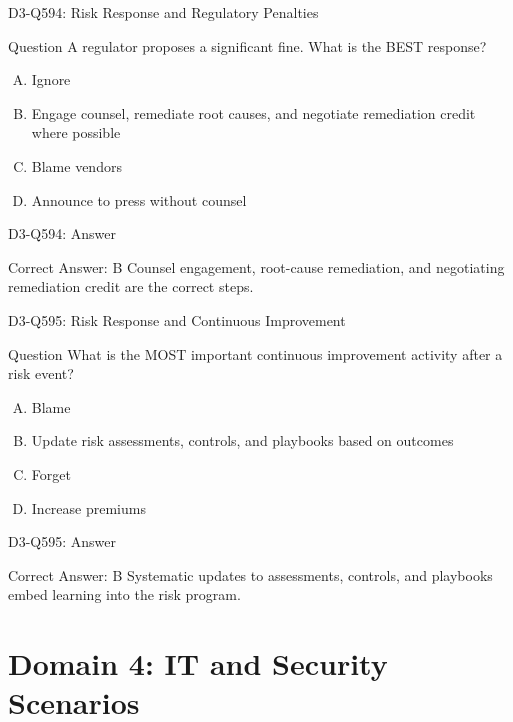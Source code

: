 \documentclass{beamer}
\begin{document}
	\begin{frame}{D3-Q594: Risk Response and Regulatory Penalties}
		\begin{block}{Question}
			A regulator proposes a significant fine. What is the BEST response?
		\end{block}
		\begin{enumerate}[(A)]
			\item Ignore
			\item Engage counsel, remediate root causes, and negotiate remediation credit where possible
			\item Blame vendors
			\item Announce to press without counsel
		\end{enumerate}
	\end{frame}
	\begin{frame}{D3-Q594: Answer}
		\begin{block}{Correct Answer: B}
			Counsel engagement, root-cause remediation, and negotiating remediation credit are the correct steps.
		\end{block}
	\end{frame}
	
	\begin{frame}{D3-Q595: Risk Response and Continuous Improvement}
		\begin{block}{Question}
			What is the MOST important continuous improvement activity after a risk event?
		\end{block}
		\begin{enumerate}[(A)]
			\item Blame
			\item Update risk assessments, controls, and playbooks based on outcomes
			\item Forget
			\item Increase premiums
		\end{enumerate}
	\end{frame}
	\begin{frame}{D3-Q595: Answer}
		\begin{block}{Correct Answer: B}
			Systematic updates to assessments, controls, and playbooks embed learning into the risk program.
		\end{block}
	\end{frame}
	
	\section{Domain 4: IT and Security Scenarios}
	
\end{document}
